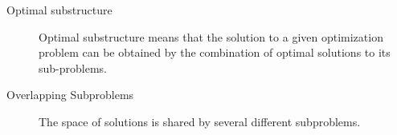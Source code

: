 \documentclass[]{article}
\begin{document}
\begin{description}
	\item[Optimal substructure] Optimal substructure means that the solution to a given optimization problem can be obtained by the combination of optimal solutions to its sub-problems. 
	
	
	
	\item[Overlapping Subproblems] The space of solutions is shared by several different subproblems.
\end{description}
\end{document}
